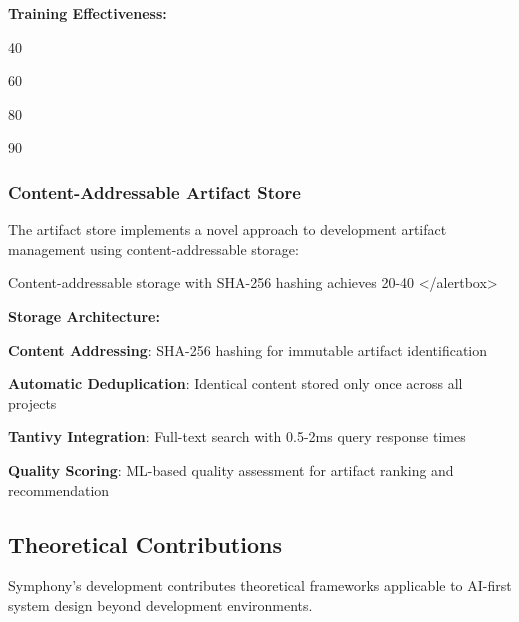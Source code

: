 \begin{successbox}
\begin{alertbox}
\begin{successbox}
\textbf{Training Effectiveness:}

\begin{compactlist}
    \item 40%
    \item 60%
    \item 80%
    \item 90%
\end{compactlist}

\subsubsection{Content-Addressable Artifact Store}

The artifact store implements a novel approach to development artifact management using content-addressable storage:

\begin{alertbox}
Content-addressable storage with SHA-256 hashing achieves 20-40%
</alertbox>

\textbf{Storage Architecture:}

\begin{expandedlist}
    \item \textbf{Content Addressing}: SHA-256 hashing for immutable artifact identification
    
    \item \textbf{Automatic Deduplication}: Identical content stored only once across all projects
    
    \item \textbf{Tantivy Integration}: Full-text search with 0.5-2ms query response times
    
    \item \textbf{Quality Scoring}: ML-based quality assessment for artifact ranking and recommendation
\end{expandedlist}

\subsection{Theoretical Contributions}
\label{subsec:theoretical-contributions}

Symphony's development contributes theoretical frameworks applicable to AI-first system design beyond development environments.


\end{alertbox}
\end{successbox}
\end{alertbox}
\end{successbox}
